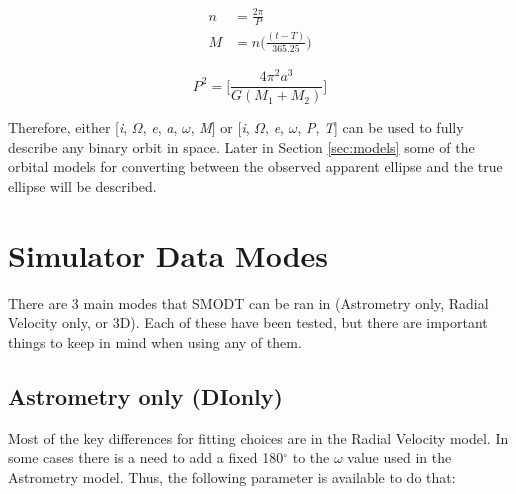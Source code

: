 \documentclass[12pt,preprint]{aastex}
\begin{document}
\begin{subequations}
\begin{align}\label{eq:nAndMa}
n &= \frac{2\pi}{P} \\
\label{eq:nAndMb}
M &= n \bigg( \frac{(t-T)}{365.25} \bigg)
\end{align}
\end{subequations}

\begin{equation}\label{eq:KepThird}
P^2 = \bigg[\frac{4\pi^2a^3}{G(M_1+M_2)} \bigg]
\end{equation}

Therefore, either [{\it i}, $\Omega$, {\it e}, {\it a}, $\omega$, {\it M}] or [{\it i}, $\Omega$, {\it e}, $\omega$, {\it P}, {\it T}] can be used to fully describe any binary orbit in space.  Later in Section \ref{sec:models} some of the orbital models for converting between the observed apparent ellipse and the true ellipse will be described. 

\clearpage
\section{Simulator Data Modes}\label{sec:simDataModes}

There are 3 main modes that SMODT can be ran in (Astrometry only, Radial Velocity only, or 3D).  Each of these have been tested, but there are important things to keep in mind when using any of them.
\subsection{Astrometry only (DIonly)}
Most of the key differences for fitting choices are in the Radial Velocity model.  In some cases there is a need to add a fixed 180$^{\circ}$ to the $\omega$ value used in the Astrometry model.  Thus, the following parameter is available to do that:
\end{document}
